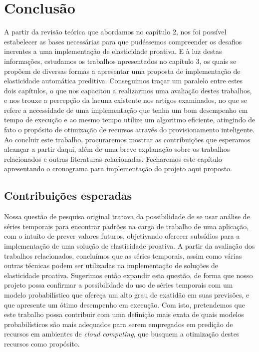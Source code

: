\documentclass[twoside,english,brazilian]{UNISINOSmonografia}
\begin{document}
\chapter{Conclusão}
A partir da revisão teórica que abordamos no capítulo 2, nos foi possível estabelecer as bases necessárias para que pudéssemos compreender os desafios inerentes a uma implementação de elasticidade proativa. E à luz destas informações, estudamos os trabalhos apresentados no capítulo 3, os quais se propõem de diversas formas a apresentar uma proposta de implementação de elasticidade automática preditiva. Conseguimos traçar um paralelo entre estes dois capítulos, o que nos capacitou a realizarmos uma avaliação destes trabalhos, e nos trouxe a percepção da lacuna existente nos artigos examinados, no que se refere a necessidade de uma implementação que tenha um bom desempenho em tempo de execução e ao mesmo tempo utilize um algoritmo eficiente, atingindo de fato o propósito de otimização de recursos através do provisionamento inteligente. Ao concluir este trabalho, procuraremos mostrar as contribuições que esperamos alcançar a partir daqui, além de uma breve explanação sobre os trabalhos relacionados e outras literaturas relacionadas. Fecharemos este capítulo apresentando o cronograma para implementação do projeto aqui proposto.

\section{Contribuições esperadas}
Nossa questão de pesquisa original tratava da possibilidade de se usar análise de séries temporais para encontrar padrões na carga de trabalho de uma aplicação, com o intuito de prever valores futuros, objetivando oferecer subsídios para  a implementação de uma solução de elasticidade proativa. A partir da avaliação dos trabalhos relacionados, concluímos que as séries temporais, assim como várias outras técnicas podem ser utilizadas na implementação de soluções de elasticidade proativa. Sugerimos então expandir esta questão, de forma que nosso projeto possa confirmar a possibilidade do uso de séries temporais com um modelo probabilístico que ofereça um alto grau de exatidão em suas previsões, e que apresente um ótimo desempenho em execução. Com isto, pretendemos que este trabalho possa contribuir com uma definição mais exata de quais modelos probabilísticos são mais adequados para serem empregados em predição de recursos em ambientes de \textit{cloud computing}, que busquem a otimização destes recursos como propósito. 
\end{document}
